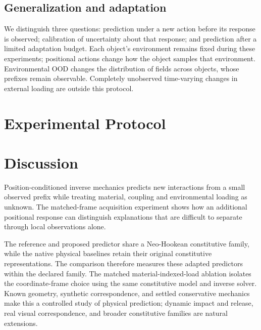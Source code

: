 \documentclass[10pt,twocolumn,letterpaper]{article}
\begin{document}
\subsection{Generalization and adaptation}
We distinguish three questions: prediction under a new action before its response is observed; calibration of uncertainty about that response; and prediction after a limited adaptation budget. Each object's environment remains fixed during these experiments; positional actions change how the object samples that environment. Environmental OOD changes the distribution of fields across objects, whose prefixes remain observable. Completely unobserved time-varying changes in external loading are outside this protocol.

\section{Experimental Protocol}


\section{Discussion}
Position-conditioned inverse mechanics predicts new interactions from a small observed prefix while treating material, coupling and environmental loading as unknown. The matched-frame acquisition experiment shows how an additional positional response can distinguish explanations that are difficult to separate through local observations alone.

The reference and proposed predictor share a Neo-Hookean constitutive family, while the native physical baselines retain their original constitutive representations. The comparison therefore measures these adapted predictors within the declared family. The matched material-indexed-load ablation isolates the coordinate-frame choice using the same constitutive model and inverse solver. Known geometry, synthetic correspondence, and settled conservative mechanics make this a controlled study of physical prediction; dynamic impact and release, real visual correspondence, and broader constitutive families are natural extensions.

\clearpage
{\small}
\end{document}
